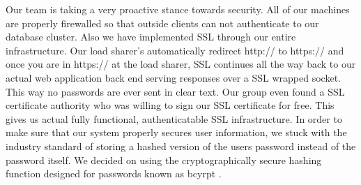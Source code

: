 \documentclass{dependencies/acm_proc_article-sp}
\begin{document}
Our team is taking a very proactive stance towards security. All of our machines are properly firewalled so that
outside clients can not authenticate to our database cluster. Also we have implemented SSL through our entire infrastructure.
Our load sharer's automatically redirect http:// to https:// and once you are in https:// at the load sharer, SSL continues all the
way back to our actual web application back end serving responses over a SSL wrapped socket. This way no passwords are ever
sent in clear text. Our group even found a SSL certificate authority who was willing to sign our SSL certificate for free. This gives
us actual fully functional, authenticatable SSL infrastructure. In order to make sure that our system properly secures user information,
we stuck with the industry standard of storing a hashed version of the users password instead of the password itself. We decided on using
the cryptographically secure hashing function designed for passwords known as bcyrpt \cite{bcrypt}.

\newpage
%

%
%
\balancecolumns
\end{document}
